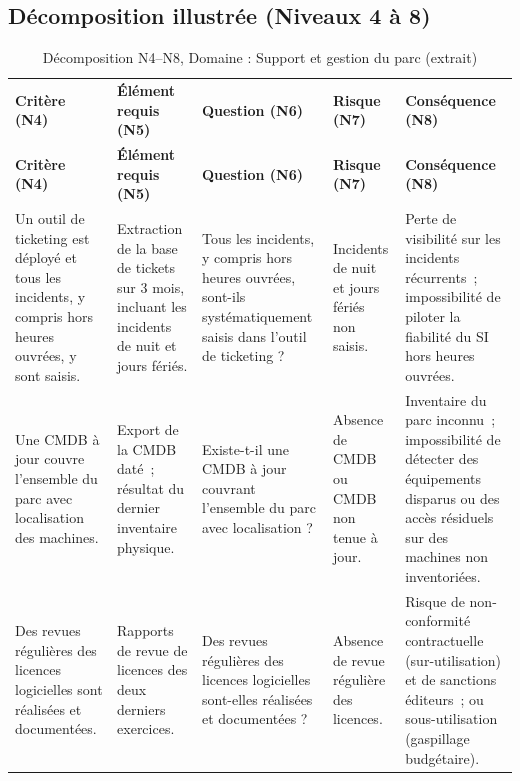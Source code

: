 \subsection{Décomposition illustrée (Niveaux 4 à 8)}

\begin{longtable}{p{2.3cm}p{2.3cm}p{2.1cm}p{2.0cm}p{2.3cm}}
\small
\caption{Décomposition N4--N8, Domaine : Support et gestion du parc (extrait)} \\
\toprule
\textbf{Critère (N4)} & \textbf{Élément requis (N5)} & \textbf{Question (N6)} & \textbf{Risque (N7)} & \textbf{Conséquence (N8)} \\
\midrule
\endfirsthead
\toprule
\textbf{Critère (N4)} & \textbf{Élément requis (N5)} & \textbf{Question (N6)} & \textbf{Risque (N7)} & \textbf{Conséquence (N8)} \\
\midrule
\endhead
\bottomrule
\endlastfoot

Un outil de ticketing est déployé et tous les incidents, y compris hors heures ouvrées, y sont saisis. &
Extraction de la base de tickets sur 3 mois, incluant les incidents de nuit et jours fériés. &
Tous les incidents, y compris hors heures ouvrées, sont-ils systématiquement saisis dans l'outil de ticketing ? &
Incidents de nuit et jours fériés non saisis. &
Perte de visibilité sur les incidents récurrents~; impossibilité de piloter la fiabilité du SI hors heures ouvrées. \\
\addlinespace

Une CMDB à jour couvre l'ensemble du parc avec localisation des machines. &
Export de la CMDB daté~; résultat du dernier inventaire physique. &
Existe-t-il une CMDB à jour couvrant l'ensemble du parc avec localisation ? &
Absence de CMDB ou CMDB non tenue à jour. &
Inventaire du parc inconnu~; impossibilité de détecter des équipements disparus ou des accès résiduels sur des machines non inventoriées. \\
\addlinespace

Des revues régulières des licences logicielles sont réalisées et documentées. &
Rapports de revue de licences des deux derniers exercices. &
Des revues régulières des licences logicielles sont-elles réalisées et documentées ? &
Absence de revue régulière des licences. &
Risque de non-conformité contractuelle (sur-utilisation) et de sanctions éditeurs~; ou sous-utilisation (gaspillage budgétaire). \\

\end{longtable}


